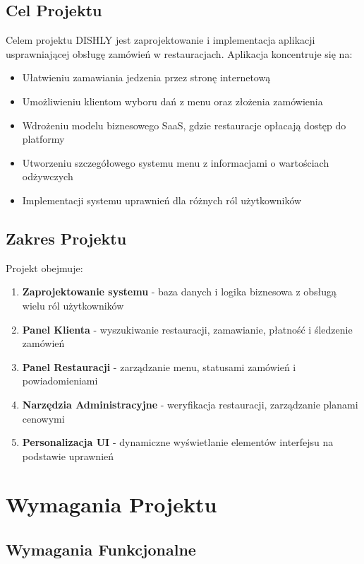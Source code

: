 \documentclass[12pt,a4paper,utf-8]{article}
\begin{document}
\subsection{Cel Projektu}

Celem projektu DISHLY jest zaprojektowanie i implementacja aplikacji usprawniającej obsługę zamówień w restauracjach. Aplikacja koncentruje się na:
\begin{itemize}
    \item Ułatwieniu zamawiania jedzenia przez stronę internetową
    \item Umożliwieniu klientom wyboru dań z menu oraz złożenia zamówienia
    \item Wdrożeniu modelu biznesowego SaaS, gdzie restauracje opłacają dostęp do platformy
    \item Utworzeniu szczegółowego systemu menu z informacjami o wartościach odżywczych
    \item Implementacji systemu uprawnień dla różnych ról użytkowników
\end{itemize}

\subsection{Zakres Projektu}

Projekt obejmuje:
\begin{enumerate}
    \item \textbf{Zaprojektowanie systemu} - baza danych i logika biznesowa z obsługą wielu ról użytkowników
    \item \textbf{Panel Klienta} - wyszukiwanie restauracji, zamawianie, płatność i śledzenie zamówień
    \item \textbf{Panel Restauracji} - zarządzanie menu, statusami zamówień i powiadomieniami
    \item \textbf{Narzędzia Administracyjne} - weryfikacja restauracji, zarządzanie planami cenowymi
    \item \textbf{Personalizacja UI} - dynamiczne wyświetlanie elementów interfejsu na podstawie uprawnień
\end{enumerate}

\newpage

\section{Wymagania Projektu}

\subsection{Wymagania Funkcjonalne}
\end{document}
